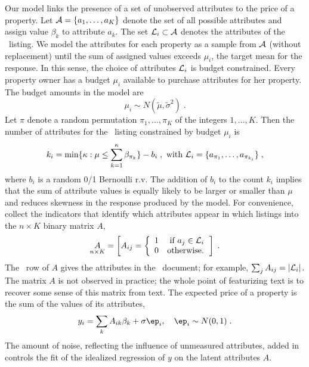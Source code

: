\documentclass[12pt]{article}
\begin{document}
Our model links the presence of a set of unobserved attributes to the price of a property.  Let ${\cal A} = \{a_1,\ldots, a_K\}$ denote the set of  all possible attributes and assign value $\beta_k$ to attribute $a_k$.  The set ${\cal L}_i \subset {\cal A}$ denotes the attributes of the \ith\ listing.  We model the attributes for each property as a sample from $\cal A$ (without replacement) until the sum of assigned values exceeds $\mu_i$, the target mean for the response.  In this sense, the choice of attributes ${\cal L}_i$ is budget constrained. Every property owner has a budget  $\mu_i$ available to purchase attributes for her property.  The budget amounts in the model are
\begin{equation}
  \mu_i  \sim N(\tilde\mu, \tilde\sigma^2) \;.
\label{eq:mui}
\end{equation}
Let $\pi$ denote a random permutation $\pi_1,\ldots,\pi_K$ of the integers $1, \ldots, K$.  Then the number of attributes for the \ith\ listing constrained by budget $\mu_i$ is 
\begin{equation}
	k_i = \min \{ \kappa:  \mu \le \sum_{k=1}^{\kappa} \beta_{\pi_k} \} - b_i \;,
	\mbox{ with }
	{\cal L}_i = \{a_{\pi_1}, \ldots, a_{\pi_{k_i}} \} \;,
\label{eq:ki}
\end{equation}
where $b_i$ is a random 0/1 Bernoulli r.v.  The addition of $b_i$ to the count $k_i$ implies that the sum of attribute values is equally likely to be larger or smaller than $\mu$ and reduces skewness in the response produced by the model.  For convenience,  collect the indicators that identify which attributes appear in which listings into the $n \times K$ binary matrix $A$,
\begin{equation}
  \underset{n \times K}{A} = \left[ A_{ij} =
              \left\{ \begin{array}{cc} 1 & \mbox{ if } a_j \in {\cal L}_i \cr 0 & \mbox{otherwise.} 
                       \end{array} \right. \right]  \;.
   \label{eq:A}
\end{equation}
The \ith\ row of $A$ gives the attributes in the \ith\ document; for example, $\sum_j A_{ij} = |{\cal L}_i|$. The matrix $A$ is not observed in practice; the whole point of featurizing text is to recover some sense of this matrix from text. The expected price of a property is the sum of the values of its attributes,
\begin{equation}
	y_i = \sum_k A_{ik} \beta_k + \sigma \ep_i, \quad \ep_i \sim N(0,1) \;.
\label{eq:yi}
\end{equation}
The amount of noise, reflecting the influence of unmeasured attributes, added in  controls the fit of the idealized regression of $y$ on the latent attributes $A$.  
\end{document}
